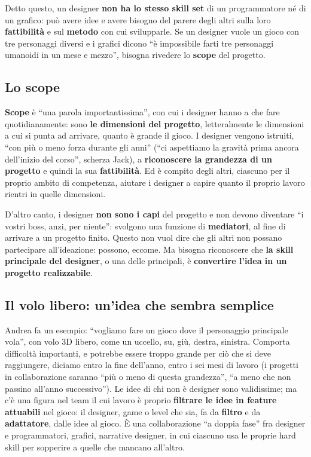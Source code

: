 Detto questo, un designer \textbf{non ha lo stesso skill set} di un
programmatore né di un grafico: può avere idee e avere bisogno del parere
degli altri sulla loro \textbf{fattibilità} e sul \textbf{metodo} con cui
svilupparle. Se un designer vuole un gioco con tre personaggi diversi e i
grafici dicono ``è impossibile farti tre personaggi umanoidi in un mese e
mezzo'', bisogna rivedere lo \textbf{scope} del progetto.

\subsection{Lo scope}
\label{p2:sec:scope}

\textbf{Scope} è ``una parola importantissima'', con cui i designer hanno a
che fare quotidianamente: sono \textbf{le dimensioni del progetto},
letteralmente le dimensioni a cui si punta ad arrivare, quanto è grande il
gioco. I designer vengono istruiti, ``con più o meno forza durante gli anni''
(``ci aspettiamo la gravità prima ancora dell'inizio del corso'', scherza
Jack), a \textbf{riconoscere la grandezza di un progetto} e quindi la sua
\textbf{fattibilità}. Ed è compito degli altri, ciascuno per il proprio
ambito di competenza, aiutare i designer a capire quanto il proprio lavoro
rientri in quelle dimensioni.

D'altro canto, i designer \textbf{non sono i capi} del progetto e non devono
diventare ``i vostri boss, anzi, per niente'': svolgono una funzione di
\textbf{mediatori}, al fine di arrivare a un progetto finito. Questo non
vuol dire che gli altri non possano partecipare all'ideazione: possono,
eccome. Ma bisogna riconoscere che \textbf{la skill principale del
designer}, o una delle principali, è \textbf{convertire l'idea in un progetto
realizzabile}.

\subsection{Il volo libero: un'idea che sembra semplice}

Andrea fa un esempio: ``vogliamo fare un gioco dove il personaggio
principale vola'', con volo 3D libero, come un uccello, su, giù, destra,
sinistra. Comporta difficoltà importanti, e potrebbe essere troppo grande per
ciò che si deve raggiungere, diciamo entro la fine dell'anno, entro i sei
mesi di lavoro (i progetti in collaborazione saranno ``più o meno di questa
grandezza'', ``a meno che non passino all'anno successivo''). Le idee di chi
non è designer sono validissime; ma c'è una figura nel team il cui lavoro è
proprio \textbf{filtrare le idee in feature attuabili} nel gioco: il
designer, game o level che sia, fa da \textbf{filtro} e da
\textbf{adattatore}, dalle idee al gioco. È una collaborazione ``a doppia
fase'' fra designer e programmatori, grafici, narrative designer, in cui
ciascuno usa le proprie hard skill per sopperire a quelle che mancano
all'altro.

